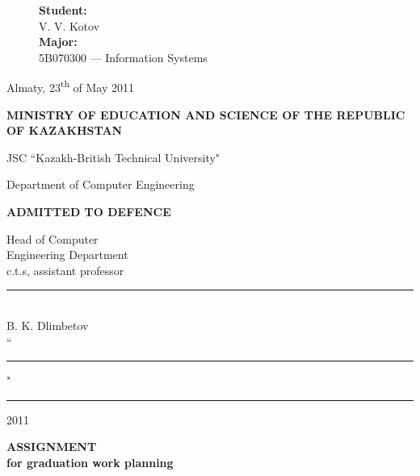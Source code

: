 \begin{titlepage}
\begin{figure}[ht]
\begin{minipage}[t]{0.5\linewidth}
\begin{flushright}
				{\bf Student:}\\
				V. V. Kotov\\
				\vspace{0.5\baselineskip}
				{\bf Major:}\\
				5B070300 --- Information Systems

			\end{flushright}
		\end{minipage}
	\end{figure}

	\begin{center}
		\vfill
		Almaty, 23\textsuperscript{th} of May 2011
	\end{center}

	\pagebreak


	\begin{center}
		{\bf{\MakeUppercase{Ministry of education and science of the republic of Kazakhstan}}

		\vspace{12pt}

		JSC ``Kazakh-British Technical University"


		Department of Computer Engineering}

		\begin{flushright}
			{\bf \MakeUppercase{Admitted to defence}}

			Head of Computer\\
			Engineering Department\\
			c.t.s, assistant professor\\
			\vspace{0.5\baselineskip}
			\rule{13em}{0.4pt}\\
			B. K. Dlimbetov\\
			\vspace{0.5\baselineskip}
			``\rule{2em}{0.4pt}" \rule{8em}{0.4pt} 2011\\
		\end{flushright}

		{\bf
		\MakeUppercase{Assignment}\\
		for graduation work planning}

		\vspace{12pt}


\end{center}
\end{titlepage}
